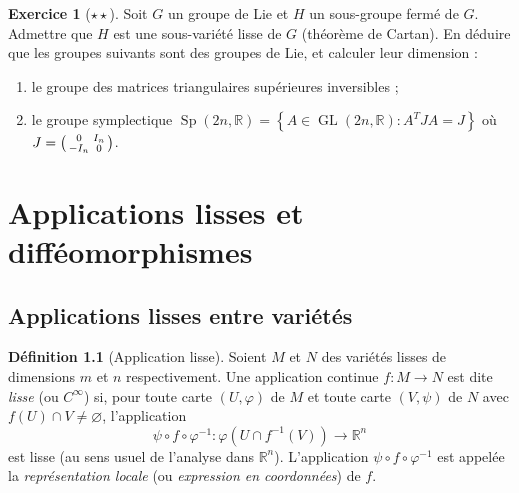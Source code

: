 \documentclass[12pt,a4paper,openany]{book}
\theoremstyle{definition}
\newtheorem{definition}{Définition}[chapter]
\newtheorem{exercice}{Exercice}[chapter]
\theoremstyle{plain}
\theoremstyle{remark}
\newcommand{\R}{\mathbb{R}}
\DeclareMathOperator{\GL}{GL}
\newcommand{\set}[1]{\left\{#1\right\}}
\begin{document}
\begin{exercice}[$\star\star$]\label{exo:sous-groupe-fermé}
Soit $G$ un groupe de Lie et $H$ un sous-groupe fermé de $G$. Admettre que $H$
est une sous-variété lisse de $G$ (théorème de Cartan). En déduire que les
groupes suivants sont des groupes de Lie, et calculer leur dimension :
\begin{enumerate}[label=(\alph*)]
    \item le groupe des matrices triangulaires supérieures inversibles ;
    \item le groupe symplectique $\operatorname{Sp}(2n, \R) = \set{A \in
    \GL(2n, \R) : A^T J A = J}$ où $J = \begin{psmallmatrix} 0 & I_n \\ -I_n
    & 0 \end{psmallmatrix}$.
\end{enumerate}
\end{exercice}


%
%
\chapter{Applications lisses et difféomorphismes}
\label{chap:applications-lisses}
\minitoc

\section{Applications lisses entre variétés}
\label{sec:applications-lisses}

\begin{definition}[Application lisse]\label{def:application-lisse}
Soient $M$ et $N$ des variétés lisses de dimensions $m$ et $n$ respectivement.
Une application continue $f \colon M \to N$ est dite \emph{lisse} (ou
\emph{$C^\infty$}) si, pour toute carte $(U, \varphi)$ de $M$ et toute carte
$(V, \psi)$ de $N$ avec $f(U) \cap V \neq \varnothing$, l'application
\[
    \psi \circ f \circ \varphi^{-1} \colon
    \varphi(U \cap f^{-1}(V)) \longrightarrow \R^n
\]
est lisse (au sens usuel de l'analyse dans $\R^n$). L'application $\psi \circ f
\circ \varphi^{-1}$ est appelée la \emph{représentation locale} (ou \emph{expression en coordonnées}) de $f$.
\end{definition}
\end{document}
